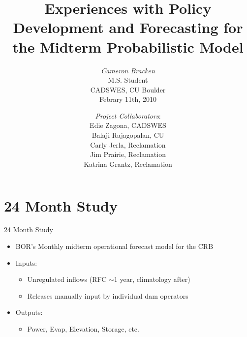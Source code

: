 \documentclass{beamer}
\title[\scshape Probabalistic Midterm Model]{Experiences with Policy Development and Forecasting for the Midterm Probabilistic Model}
\author[\it Cameron Bracken]{{\it Cameron Bracken}\small\\M.S. Student\\CADSWES, CU Boulder\\Febrary 11th, 2010}
\date{{\it Project Collaborators}:\small\\Edie Zagona, CADSWES\\Balaji Rajagopalan, CU\\Carly Jerla, Reclamation\\Jim Prairie, Reclamation\\Katrina Grantz, Reclamation}
\begin{document}
\begin{frame}
\titlepage
\end{frame}

\section{24 Month Study}
\begin{frame}{24 Month Study}
\begin{itemize}
	\item BOR's Monthly midterm operational forecast model for the CRB
	\item Inputs: 
		\begin{itemize}
			\item Unregulated inflows (RFC $\sim$1 year, climatology after)
			\item Releases manually input by individual dam operators
		\end{itemize}
	\item Outputs: 
	\begin{itemize}
		\item Power, Evap, Elevation, Storage, etc. 
	\end{itemize}
\end{itemize}
\end{frame}

\end{document}
